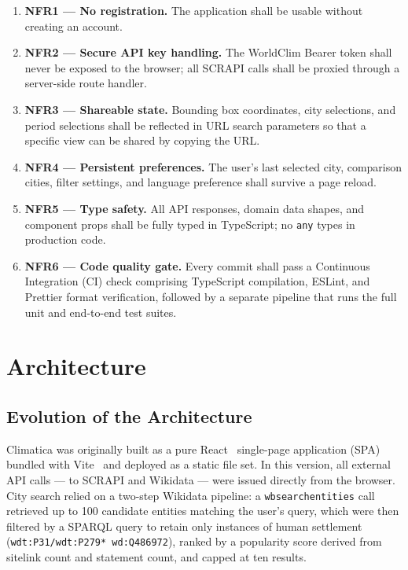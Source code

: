 \begin{enumerate}
  \item \textbf{NFR1 --- No registration.} The application shall be usable
    without creating an account.

  \item \textbf{NFR2 --- Secure API key handling.} The WorldClim Bearer token
    shall never be exposed to the browser; all SCRAPI calls shall be proxied
    through a server-side route handler.

  \item \textbf{NFR3 --- Shareable state.} Bounding box coordinates, city
    selections, and period selections shall be reflected in URL search parameters
    so that a specific view can be shared by copying the URL.

  \item \textbf{NFR4 --- Persistent preferences.} The user's last selected city,
    comparison cities, filter settings, and language preference shall survive a
    page reload.

  \item \textbf{NFR5 --- Type safety.} All API responses, domain data shapes,
    and component props shall be fully typed in TypeScript; no \texttt{any}
    types in production code.

  \item \textbf{NFR6 --- Code quality gate.} Every commit shall pass a
    Continuous Integration (CI) check comprising TypeScript compilation,
    ESLint, and Prettier format verification, followed by a separate pipeline
    that runs the full unit and end-to-end test suites.
\end{enumerate}


\section{Architecture}\label{APP_ARCH}

\subsection{Evolution of the Architecture}\label{APP_ARCH_EVOLUTION}

Climatica was originally built as a pure React~\cite{react} single-page
application (SPA)~\cite{flanagan2020spa} bundled with Vite~\cite{vite} and
deployed as a static file set. In this version, all external API calls --- to
SCRAPI and Wikidata --- were issued directly from the browser. City search
relied on a two-step Wikidata pipeline: a \texttt{wbsearchentities} call
retrieved up to 100 candidate entities matching the user's query, which were
then filtered by a SPARQL query to retain only instances of human settlement
(\texttt{wdt:P31/wdt:P279* wd:Q486972}), ranked by a popularity score derived
from sitelink count and statement count, and capped at ten results.

